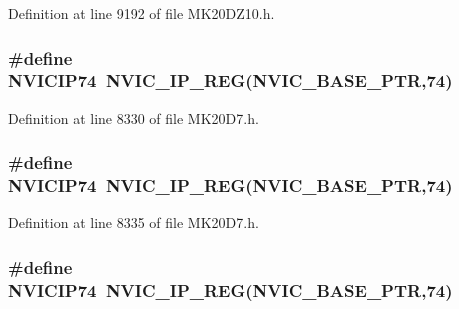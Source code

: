 Definition at line 9192 of file M\+K20\+D\+Z10.\+h.

\subsubsection[{\texorpdfstring{N\+V\+I\+C\+I\+P74}{NVICIP74}}]{\setlength{\rightskip}{0pt plus 5cm}\#define N\+V\+I\+C\+I\+P74~{\bf N\+V\+I\+C\+\_\+\+I\+P\+\_\+\+R\+EG}({\bf N\+V\+I\+C\+\_\+\+B\+A\+S\+E\+\_\+\+P\+TR},74)}\hypertarget{group___n_v_i_c___register___accessor___macros_ga2bea96d6948c24d6529680bd1c0aa035}{}\label{group___n_v_i_c___register___accessor___macros_ga2bea96d6948c24d6529680bd1c0aa035}


Definition at line 8330 of file M\+K20\+D7.\+h.

\subsubsection[{\texorpdfstring{N\+V\+I\+C\+I\+P74}{NVICIP74}}]{\setlength{\rightskip}{0pt plus 5cm}\#define N\+V\+I\+C\+I\+P74~{\bf N\+V\+I\+C\+\_\+\+I\+P\+\_\+\+R\+EG}({\bf N\+V\+I\+C\+\_\+\+B\+A\+S\+E\+\_\+\+P\+TR},74)}\hypertarget{group___n_v_i_c___register___accessor___macros_ga2bea96d6948c24d6529680bd1c0aa035}{}\label{group___n_v_i_c___register___accessor___macros_ga2bea96d6948c24d6529680bd1c0aa035}


Definition at line 8335 of file M\+K20\+D7.\+h.

\subsubsection[{\texorpdfstring{N\+V\+I\+C\+I\+P74}{NVICIP74}}]{\setlength{\rightskip}{0pt plus 5cm}\#define N\+V\+I\+C\+I\+P74~{\bf N\+V\+I\+C\+\_\+\+I\+P\+\_\+\+R\+EG}({\bf N\+V\+I\+C\+\_\+\+B\+A\+S\+E\+\_\+\+P\+TR},74)}\hypertarget{group___n_v_i_c___register___accessor___macros_ga2bea96d6948c24d6529680bd1c0aa035}{}\label{group___n_v_i_c___register___accessor___macros_ga2bea96d6948c24d6529680bd1c0aa035}


